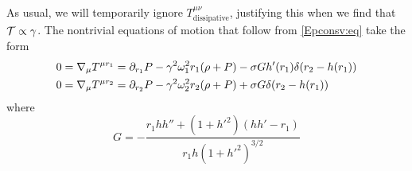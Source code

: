 As usual, we will temporarily ignore
$T^{\mu\nu}_\mathrm{dissipative}$, justifying this when we find that
$\mathcal{T}\propto\gamma$. The nontrivial equations of motion that follow
from \eqref{Epconsv:eq} take the form
%
\begin{equation}\label{5deom:eq}
\begin{split}
  0 = \nabla_\mu T^{\mu r_1}
   &= \partial_{r_1}P -\gamma^2\omega_1^2r_1(\rho+P) -\sigma G h'(r_1)\delta(r_2-h(r_1))\\
  0 = \nabla_\mu T^{\mu r_2}
   &= \partial_{r_2}P -\gamma^2\omega_2^2r_2(\rho+P) +\sigma G \delta(r_2-h(r_1))
\end{split}
\end{equation}
%
where
%
\begin{equation*}
  G = -\frac{r_1hh''+(1+h'^2)(hh'-r_1)}{r_1h(1+h'^2)^{3/2}}
\end{equation*}
%

